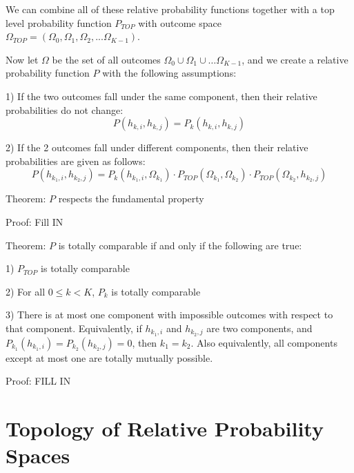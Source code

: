 \documentclass[twoside]{article}
\begin{document}
We can combine all of these relative probability functions together with a top level probability function \(P_{TOP}\) with outcome space \(\Omega_{TOP} = (\Omega_0, \Omega_1, \Omega_2, ... \Omega_{K- 1})\).


Now let \(\Omega\) be the set of all outcomes \(\Omega_0 \cup \Omega_1 \cup \dots \Omega_{K-1}\), and we create a relative probability function \(P\) with the following assumptions:

1) If the two outcomes fall under the same component, then their relative probabilities do not change:
\[P(h_{k, i}, h_{k, j}) = P_k(h_{k, i}, h_{k, j})\]

2) If the 2 outcomes fall under different components, then their relative probabilities are given as follows:
\[P(h_{k_1, i}, h_{k_2, j}) = P_k(h_{k_1, i}, \Omega_{k_1}) \cdot  P_{TOP}(\Omega_{k_1}, \Omega_{k_2}) \cdot P_{TOP}(\Omega_{k_2}, h_{k_2, j})\]

Theorem: \(P\) respects the fundamental property

Proof: Fill IN

Theorem: \(P\) is totally comparable if and only if the following are true:

1) \(P_{TOP}\) is totally comparable

2) For all \(0 \leq k < K\), \(P_k\) is totally comparable

3) There is at most one component with impossible outcomes with respect to that component. Equivalently, if \(h_{k_1, i}\) and \(h_{k_2, j}\) are two components, and \(P_{k_1}(h_{k_1, i}) = P_{k_2}(h_{k_2, j}) = 0\), then \(k_1 = k_2\). Also equivalently, all components except at most one are totally mutually possible.

Proof: FILL IN

\section{Topology of Relative Probability Spaces}
\end{document}
